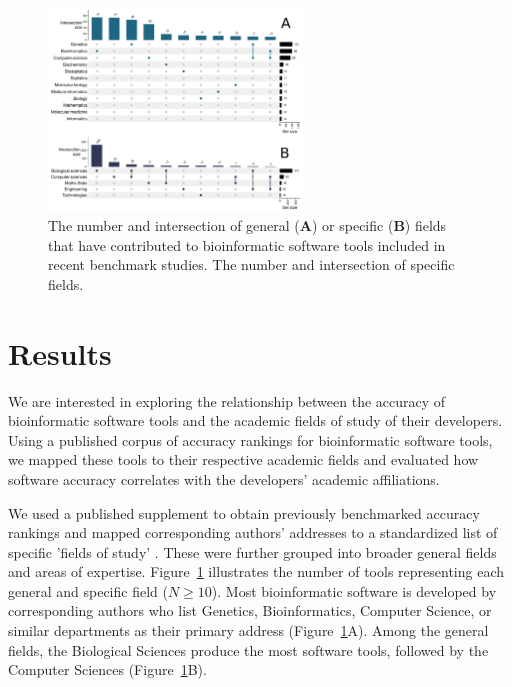 \documentclass[fleqn,10pt,doc,onecolumn]{SelfArx}%
\begin{document}
\begin{figure}[ht!]
\begin{center}
  \includegraphics[width=0.6\textwidth]{upset-plots.pdf}
\end{center}
  \caption{ The number and intersection of general (\textbf{A}) or
  specific (\textbf{B}) fields that have contributed to bioinformatic
  software tools included in recent benchmark studies.  The number and
  intersection of specific fields.  }
\label{fig:fig1}
\end{figure}


\section*{Results}

We are interested in exploring the relationship between the accuracy
of bioinformatic software tools and the academic fields of study of
their developers. Using a published corpus of accuracy rankings
for bioinformatic software tools, we mapped these tools to their
respective academic fields and evaluated how software accuracy
correlates with the developers' academic affiliations.


We used a published supplement \cite{gardner2024} to obtain previously
benchmarked accuracy rankings and mapped corresponding authors'
addresses to a standardized list of specific 'fields of study'
\cite{fields2014}. These were further grouped into broader general
fields and areas of expertise. Figure~\ref{fig:fig1} illustrates the
number of tools representing each general and specific field ($N\ge 10$). Most
bioinformatic software is developed by corresponding authors who list
Genetics, Bioinformatics, Computer Science, or similar departments as
their primary address (Figure~\ref{fig:fig1}A). Among the general
fields, the Biological Sciences produce the most software tools,
followed by the Computer Sciences (Figure~\ref{fig:fig1}B).
\end{document}
